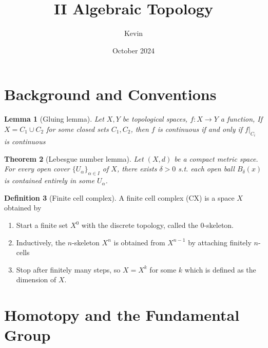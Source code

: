 \documentclass{article}
\title{II Algebraic Topology}
\author{Kevin}
\date{October 2024}
\theoremstyle{definition}
\newtheorem{defn}{Definition}[section]
\theoremstyle{remark}
\theoremstyle{plain}
\newtheorem{lem}[defn]{Lemma}
\newtheorem{thm}[defn]{Theorem}
\begin{document}
\maketitle
\section{Background and Conventions}
\begin{lem}[Gluing lemma]
    Let $X,Y$ be topological spaces, $f:X\to Y$ a function, If $X=C_1\cup C_2$ for some closed sets $C_1,C_2$, then $f$ is continuous if and only if $f|_{C_i}$ is continuous
\end{lem}
\begin{thm}[Lebesgue number lemma]
Let $(X,d)$ be a compact metric space. For every open cover $\{U_\alpha\}_{\alpha\in I}$ of $X$, there exists $\delta>0$ s.t. each open ball $B_\delta(x)$ is contained entirely in some $U_\alpha$.    
\end{thm}
\begin{defn}[Finite cell complex]
A finite cell complex (CX) is a space $X$ obtained by
\begin{enumerate}
    \item Start a finite set $X^0$ with the discrete topology, called the $0$-skeleton.
    \item Inductively, the $n$-skeleton $X^n$ is obtained from $X^{n-1}$ by attaching finitely $n$-cells
    \item Stop after finitely many steps, so $X=X^k$ for some $k$ which is defined as the dimension of $X$.
\end{enumerate}
\end{defn}

\section{Homotopy and the Fundamental Group}
\end{document}
